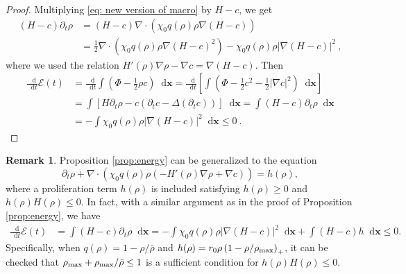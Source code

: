 \documentclass{aims} %
\theoremstyle{definition}
\newtheorem{remark}[theorem]{Remark}
\newcommand {\bx} { {\mathbf{x}} }
\newcommand*\diff{\mathop{}\!\mathrm{d}}
\begin{document}
 
\begin{proof}
 Multiplying \eqref{eq: new version of macro} by $H- c$, we get
\begin{align}
    (H-c)\partial_t\rho & =(H-c)\nabla\cdot(\chi_0 q(\rho)\rho\nabla(H-c))\nonumber\\ & = \frac{1}{2}\nabla\cdot\left( \chi_0 q(\rho)\rho\nabla(H-c)^2\right)-\chi_0 q(\rho)\rho|\nabla(H-c)|^2 \ ,\nonumber
\end{align}
where we used the relation $H'(\rho)\nabla\rho-\nabla c=\nabla(H-c)$.
Then
\begin{align*}
    \frac{\diff}{\diff t}\mathcal{E}(t) & = \frac{\diff }{\diff t}\int \left(\Phi-\frac{1}{2}\rho c \right)\diff \bx
    = \frac{\diff }{\diff t} \left[\int \left(\Phi-\frac{1}{2} c^2 -\frac{1}{2} |\nabla c|^2 \right)\diff \bx\right]\\
    & = \int\left[ H\partial_t\rho - c \left(\partial_t c - \Delta(\partial_t c)\right) \right] \diff \bx  = \int (H - c)\partial_t\rho \diff \bx \\
    &=-\int \chi_0 q(\rho)\rho|\nabla(H-c)|^2\diff \bx\leq 0\ .
\end{align*}
\end{proof}
\begin{remark}\label{rem 6}
Proposition \ref{prop:energy} can be generalized to the equation 
\begin{equation*}
    \partial_t\rho+\nabla\cdot(\chi_0 q(\rho)\rho(-H'(\rho)\nabla\rho+\nabla c))=h(\rho),
\end{equation*}
{ where a proliferation term $h(\rho)$ is included satisfying $h(\rho)\ge0$ and $h(\rho)H(\rho)\le0$. 
In fact, with a similar argument as in the proof of Proposition \ref{prop:energy}, we have 
\begin{align*}
    \frac{\diff}{\diff t}\mathcal{E}(t) & = \int (H - c)\partial_t\rho \diff \bx 
    =-\int \chi_0 q(\rho)\rho|\nabla(H-c)|^2\diff \bx + \int (H-c) h \diff \bx \le 0.
\end{align*}
Specifically, when $q(\rho) = 1 - \rho / \bar{\rho}$ and $h(\rho) = r_0 \rho\left(1 - \rho/\rho_{\rm max}\right)_+$, it can be checked that $\rho_{\rm max} + \rho_{\rm max} / \bar{\rho} \le1$ is a sufficient condition for  $h(\rho)H(\rho)\le0$. }
\end{remark}
\end{document}
